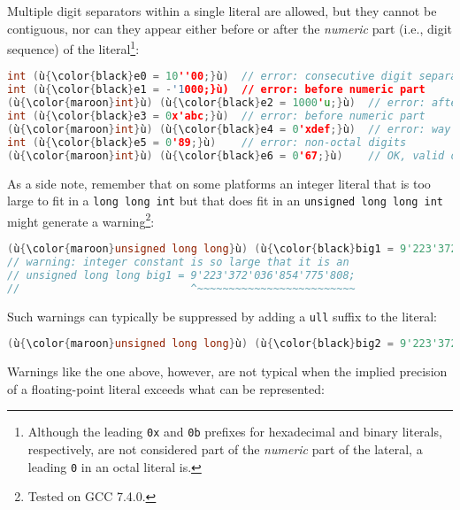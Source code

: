 \noindent Multiple digit separators within a single literal are allowed, but they
cannot be contiguous, nor can they appear either before or after the
\emph{numeric} part (i.e., digit sequence) of the
literal{\cprotect\footnote{Although the leading \texttt{0x} and
\texttt{0b} prefixes for hexadecimal and binary literals,
respectively, are not considered part of the \emph{numeric} part of
the lateral, a leading \texttt{0} in an octal literal is.}}:

\begin{lstlisting}[language=C++]
int (ù{\color{black}e0 = 10''00;}ù)  // error: consecutive digit separators
int (ù{\color{black}e1 = -'1000;}ù)  // error: before numeric part
(ù{\color{maroon}int}ù) (ù{\color{black}e2 = 1000'u;}ù)  // error: after numeric part
int (ù{\color{black}e3 = 0x'abc;}ù)  // error: before numeric part
(ù{\color{maroon}int}ù) (ù{\color{black}e4 = 0'xdef;}ù)  // error: way before numeric part
int (ù{\color{black}e5 = 0'89;}ù)    // error: non-octal digits
(ù{\color{maroon}int}ù) (ù{\color{black}e6 = 0'67;}ù)    // OK, valid octal literal
\end{lstlisting}

\noindent As a side note, remember that on some platforms an integer literal
that is too large to fit in a \texttt{long}~\texttt{long}~\texttt{int} but that does fit in an
\texttt{unsigned}~\texttt{long}~\texttt{long}~\texttt{int} might
generate a warning{\cprotect\footnote{Tested on GCC 7.4.0.}}:

\begin{lstlisting}[language=C++]
(ù{\color{maroon}unsigned long long}ù) (ù{\color{black}big1 = 9'223'372'036'854'775'808;}ù)  // (ù{\codeincomments{2\^{}63}}ù)
// warning: integer constant is so large that it is an
// unsigned long long big1 = 9'223'372'036'854'775'808;
//                           ^~~~~~~~~~~~~~~~~~~~~~~~~~
\end{lstlisting}

\noindent Such warnings can typically be suppressed by adding a \texttt{ull}
suffix to the literal:

\begin{lstlisting}[language=C++]
(ù{\color{maroon}unsigned long long}ù) (ù{\color{black}big2 = 9'223'372'036'854'775'808ull;}ù)  // OK
\end{lstlisting}

\noindent Warnings like the one above, however, are not typical when the implied
precision of a floating-point literal exceeds what can be represented:

